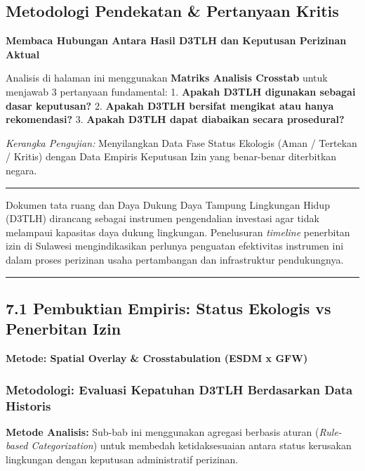 \documentclass[
]{article}
\begin{document}
\subsection{Metodologi Pendekatan \& Pertanyaan
Kritis}\label{metodologi-pendekatan-pertanyaan-kritis}

\textbf{Membaca Hubungan Antara Hasil D3TLH dan Keputusan Perizinan
Aktual}

Analisis di halaman ini menggunakan \textbf{Matriks Analisis Crosstab}
untuk menjawab 3 pertanyaan fundamental: 1. \textbf{Apakah D3TLH
digunakan sebagai dasar keputusan?} 2. \textbf{Apakah D3TLH bersifat
mengikat atau hanya rekomendasi?} 3. \textbf{Apakah D3TLH dapat
diabaikan secara prosedural?}

\emph{Kerangka Pengujian:} Menyilangkan Data Fase Status Ekologis (Aman
/ Tertekan / Kritis) dengan Data Empiris Keputusan Izin yang benar-benar
diterbitkan negara.

\begin{center}\rule{0.5\linewidth}{0.5pt}\end{center}

Dokumen tata ruang dan Daya Dukung Daya Tampung Lingkungan Hidup (D3TLH)
dirancang sebagai instrumen pengendalian investasi agar tidak melampaui
kapasitas daya dukung lingkungan. Penelusuran \emph{timeline} penerbitan
izin di Sulawesi mengindikasikan perlunya penguatan efektivitas
instrumen ini dalam proses perizinan usaha pertambangan dan
infrastruktur pendukungnya.

\begin{center}\rule{0.5\linewidth}{0.5pt}\end{center}

\subsection{7.1 Pembuktian Empiris: Status Ekologis vs Penerbitan
Izin}\label{pembuktian-empiris-status-ekologis-vs-penerbitan-izin}

\textbf{Metode: Spatial Overlay \& Crosstabulation (ESDM x GFW)}

\subsubsection{Metodologi: Evaluasi Kepatuhan D3TLH Berdasarkan Data
Historis}\label{metodologi-evaluasi-kepatuhan-d3tlh-berdasarkan-data-historis}

\textbf{Metode Analisis:} Sub-bab ini menggunakan agregasi berbasis
aturan (\emph{Rule-based Categorization}) untuk membedah ketidaksesuaian
antara status kerusakan lingkungan dengan keputusan administratif
perizinan.
\end{document}
